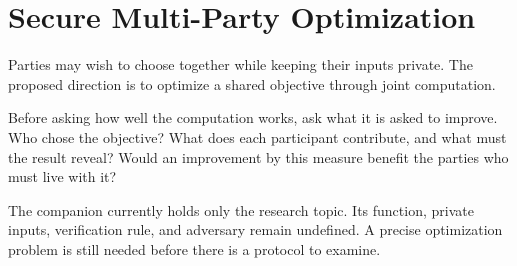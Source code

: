 \chapter{Secure Multi-Party Optimization}
\label{short:multiparty-optimization}

Parties may wish to choose together while keeping their inputs private. The
proposed direction is to optimize a shared objective through joint
computation.

Before asking how well the computation works, ask what it is asked to
improve. Who chose the objective? What does each participant contribute, and
what must the result reveal? Would an improvement by this measure benefit
the parties who must live with it?

The companion currently holds only the research topic. Its function, private
inputs, verification rule, and adversary remain undefined. A precise
optimization problem is still needed before there is a protocol to examine.

